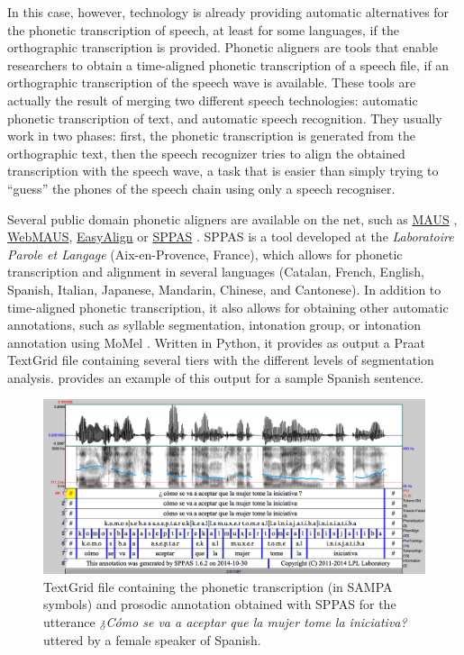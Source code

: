 \documentclass[output=paper]{langsci/langscibook}
\begin{document}
In this case, however, technology is already providing automatic alternatives for the phonetic transcription of speech, at least for some languages, if the orthographic transcription is provided. Phonetic aligners are tools that enable researchers to obtain a time-aligned phonetic transcription of a speech file, if an orthographic transcription of the speech wave is available. These tools are actually the result of merging two different speech technologies: automatic phonetic transcription of text, and automatic speech recognition. They usually work in two phases: first, the phonetic transcription is generated from the orthographic text, then the speech recognizer tries to align the obtained transcription with the speech wave, a task that is easier than simply trying to ``guess'' the phones of the speech chain using only a speech recogniser. 

Several public domain phonetic aligners are available on the net, such as \href{http://www.bas.uni-muenchen.de/Bas/BasMAUS.html}{MAUS} \citep{Schiel1999}, \href{https://clarin.phonetik.uni-muenchen.de/BASWebServices/index.html}{WebMAUS},  \href{http://latlcui.unige.ch/phonetique/easyalign.php}{EasyAlign} \citep{Goldman2011} or \href{http://www.sppas.org/}{SPPAS} \citep{Bigi2015}. \mbox{SPPAS} is a tool developed at the \textit{Laboratoire Parole et Langage} (Aix-en-Provence, France), which allows for phonetic transcription and alignment in several languages (Catalan, French, English, Spanish, Italian, Japanese, Mandarin, Chinese, and Cantonese). In addition to time-aligned phonetic transcription, it also allows for obtaining other automatic annotations, such as syllable segmentation, intonation group, or intonation annotation using MoMel \citep{Hirst1993}. Written in Python, it provides as output a Praat \citep{Boersma.praat} TextGrid file containing several tiers with the different levels of segmentation analysis.  provides an example of this output for a sample Spanish sentence.

  
 

\begin{figure}
\includegraphics[width=\textwidth]{figures/GAR-img001.png}
\caption{TextGrid file containing the phonetic transcription (in SAMPA symbols) and prosodic annotation obtained with SPPAS for the utterance \textit{¿Cómo se va a aceptar que la mujer tome la iniciativa?} uttered by a female speaker of Spanish.}
\label{fig:gar:1}
\end{figure}
\end{document}
